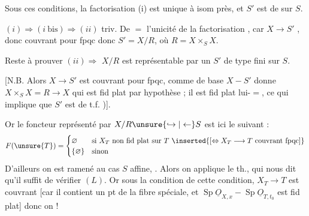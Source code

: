 Sous ces conditions, la factorisation (i) est unique à isom près, et $S'$ est de   sur $S$.

$(i)\Rightarrow(i\ \mathrm{bis})\Rightarrow(ii)$ triv. De $=$ l'unicité de la factorisation , car $X\longrightarrow S'$ , donc couvrant pour fpqc donc $S'=X/R$, où $R=X\times_S X$.

Reste à prouver $(ii)\Rightarrow$  $X/R$ est représentable par un $S'$ de  type fini sur $S$. \deleted{[N.B. alors \unsure{cela} \unsure{quasi compact} sur $S$ car $X\longrightarrow S'$ est}

[N.B. Alors $X\longrightarrow S'$ est couvrant pour fpqc, comme  de base $X-S'$  donne $X\times_S X=R\longrightarrow X$ qui est fid plat par hypothèse ; il est fid plat  lui-$=$, ce qui implique  que $S'$ est  de t.f. )].

Or  le foncteur représenté par $X/R\unsure{\hookrightarrow|\leftarrow}S$ est ici le suivant :
\[
F(\unsure{T})=\begin{cases}\varnothing&\text{si }X_T\text{ non fid plat sur }T\ \inserted{[\Leftrightarrow X_T\longrightarrow T\text{ couvrant fpqc}]}\\\{\varnothing\}&\text{sinon}\end{cases}
\]
D'ailleurs on est ramené au cas $S$ affine, .
 Alors on applique le th., qui nous dit qu'il suffit de vérifier  $(L)$. Or sous la condition de cette condition, $X_T\longrightarrow T$ est couvrant [car il contient un pt  de la fibre spéciale, et $\operatorname{Sp}\underline{O}_{X,x}-\operatorname{Sp}\underline{O}_{T,t_0}$ est fid plat] donc on  !
